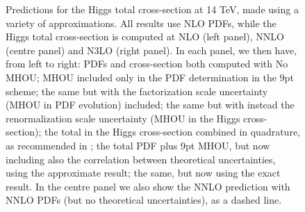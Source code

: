 \begin{figure}[h!]
    \begin{center}
    \end{center}
  \vspace{-0.55cm}
  \caption{Predictions for the Higgs total cross-section at 14 TeV, made using a variety of approximations. All results use NLO PDFs, while the Higgs total cross-section is computed at NLO (left panel), NNLO (centre panel) and N3LO (right panel). In each panel, we then have, from left to right: PDFs and cross-section both computed with No MHOU; MHOU included only in the PDF determination in the 9pt scheme; the same but with the factorization scale uncertainty (MHOU in PDF evolution) included; the same but with instead the renormalization scale uncertainty (MHOU in the Higgs cross-section); the total in the Higgs cross-section combined in quadrature, as recommended in \cite{AbdulKhalek:2019ihb}; the total PDF plus 9pt MHOU, but now including also the correlation between theoretical uncertainties, using the approximate result; the same, but now using the exact result. In the centre panel we also show the NNLO prediction with NNLO PDFs (but no theoretical uncertainties), as a dashed line. }
  \label{fig:Higgs}
\end{figure}

